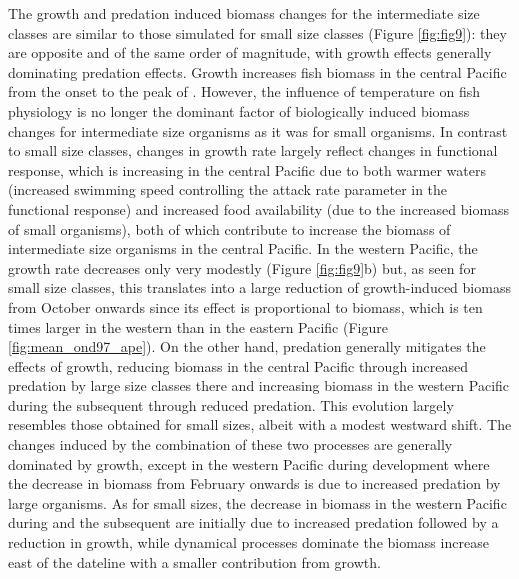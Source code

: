 The growth and predation induced biomass changes for the intermediate size classes are similar to those simulated for small size classes (Figure \ref{fig:fig9}): they are opposite and of the same order of magnitude, with growth effects generally dominating predation effects. Growth increases fish biomass in the central Pacific from the onset to the peak of \nino{}. However, the influence of temperature on fish physiology is no longer the dominant factor of biologically induced biomass changes for intermediate size organisms as it was for small organisms. In contrast to small size classes, changes in growth rate largely reflect changes in functional response, which is increasing in the central Pacific due to both warmer waters (increased swimming speed controlling the attack rate parameter in the functional response) and increased food availability (due to the increased biomass of small organisms), both of which contribute to increase the biomass of intermediate size organisms in the central Pacific. In the western Pacific, the growth rate decreases only very modestly (Figure \ref{fig:fig9}b) but, as seen for small size classes, this translates into a large reduction of growth-induced biomass from October onwards since its effect is proportional to biomass, which is ten times larger in the western than in the eastern Pacific (Figure \ref{fig:mean_ond97_ape}).
On the other hand, predation generally mitigates the effects of growth, reducing biomass in the central Pacific through increased predation by large size classes there and increasing biomass in the western Pacific during the subsequent \nina{} through reduced predation. This evolution largely resembles those obtained for small sizes, albeit with a modest westward shift. The changes induced by the combination of these two processes are generally dominated by growth, except in the western Pacific during \nino{} development where the  decrease in biomass from February onwards is due to increased predation by large organisms. As for small sizes, the decrease in biomass in the western Pacific during \nino{} and the subsequent \nina{} are initially due to increased predation followed by a reduction in growth, while dynamical processes dominate the biomass increase east of the dateline with a smaller contribution from growth.

